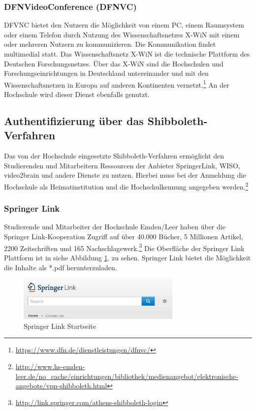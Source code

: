 \subsubsection{DFNVideoConference (DFNVC)}
DFVNC bietet den Nutzern die Möglichkeit von einem PC, einem Raumsystem oder einem Telefon durch Nutzung des Wissenschaftsnetzes X-WiN mit einem oder mehreren Nutzern zu kommunizieren. Die Kommunikation findet multimedial statt. Das Wissenschaftsnetz X-WiN ist die technische Plattform des Deutschen Forschungsnetzes. Über das X-WiN sind die Hochschulen und Forschungseinrichtungen in Deutschland untereinander und mit den Wissenschaftsnetzen in Europa auf anderen Kontinenten vernetzt.\footnote{\url{https://www.dfn.de/dienstleistungen/dfnvc/}} An der Hochschule wird dieser Dienst ebenfalls genutzt.

\subsection{Authentifizierung über das Shibboleth-Verfahren}
Das von der Hochschule eingesetzte Shibboleth-Verfahren ermöglicht den Studierenden und Mitarbeitern Ressourcen der Anbieter SpringerLink, WISO, video2brain und andere Dienste zu nutzen. Hierbei muss bei der Anmeldung die Hochschule als Heimatinstitution und die Hochschulkennung angegeben werden.\footnote{\url{http://www.hs-emden-leer.de/no_cache/einrichtungen/bibliothek/medienangebot/elektronische-angebote/vpn-shibboleth.html}}

\subsubsection{Springer Link}
Studierende und Mitarbeiter der Hochschule Emden/Leer haben über die Springer Link-Kooperation Zugriff auf über 40.000 Bücher, 5 Millionen Artikel, 2200 Zeitschriften und 165 Nachschlagewerk.\footnote{\url{http://link.springer.com/athens-shibboleth-login}} Die Oberfläche der Springer Link Plattform ist in siehe Abbildung \ref{fig_springerlink_startseite}. zu sehen. Springer Link bietet die Möglichkeit die Inhalte als *.pdf herunterzuladen. 

\begin{figure}[h!]
	\centering
	\includegraphics[width=8cm]{kapitel/gruppe2/bilder/springerlink_startseite}
	\caption{Springer Link Startseite}
	\label{fig_springerlink_startseite}
\end{figure}

